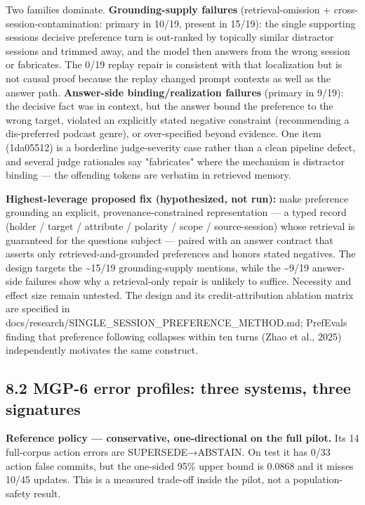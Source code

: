 Two families dominate. \textbf{Grounding-supply failures}
(retrieval-omission + cross-session-contamination: primary in 10/19,
present in 15/19): the single supporting session\textquotesingle s
decisive preference turn is out-ranked by topically similar distractor
sessions and trimmed away, and the model then answers from the wrong
session or fabricates. The 0/19 replay repair is consistent with that
localization but is not causal proof because the replay changed prompt
contexts as well as the answer path. \textbf{Answer-side
binding/realization failures} (primary in 9/19): the decisive fact was
in context, but the answer bound the preference to the wrong target,
violated an explicitly stated negative constraint (recommending a
dis-preferred podcast genre), or over-specified beyond evidence. One
item (1da05512) is a borderline judge-severity case rather than a clean
pipeline defect, and several judge rationales say "fabricates" where the
mechanism is distractor binding --- the offending tokens are verbatim in
retrieved memory.

\textbf{Highest-leverage proposed fix (hypothesized, not run):} make
preference grounding an explicit, provenance-constrained representation
--- a typed record (holder / target / attribute / polarity / scope /
source-session) whose retrieval is guaranteed for the
question\textquotesingle s subject --- paired with an answer contract
that asserts only retrieved-and-grounded preferences and honors stated
negatives. The design targets the \textasciitilde15/19 grounding-supply
mentions, while the \textasciitilde9/19 answer-side failures show why a
retrieval-only repair is unlikely to suffice. Necessity and effect size
remain untested. The design and its credit-attribution ablation matrix
are specified in docs/research/SINGLE\_SESSION\_PREFERENCE\_METHOD.md;
PrefEval\textquotesingle s finding that preference following collapses
within ten turns (Zhao et al., 2025) independently motivates the same
construct.

\subsection{8.2 MGP-6 error profiles: three systems, three
signatures}\label{mgp-6-error-profiles-three-systems-three-signatures}

\textbf{Reference policy --- conservative, one-directional on the full
pilot.} Its 14 full-corpus action errors are SUPERSEDE→ABSTAIN. On test
it has 0/33 action false commits, but the one-sided 95\% upper bound is
0.0868 and it misses 10/45 updates. This is a measured trade-off inside
the pilot, not a population-safety result.


